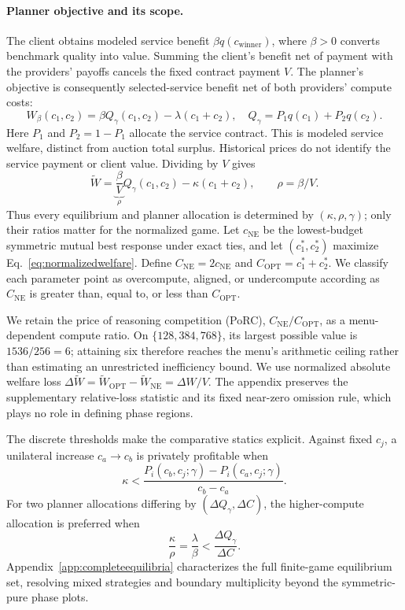 \documentclass{article}
\begin{document}
\paragraph{Planner objective and its scope.}
The client obtains modeled service benefit $\beta q(c_{\mathrm{winner}})$, where $\beta>0$ converts benchmark quality into value. Summing the client's benefit net of payment with the providers' payoffs cancels the fixed contract payment $V$. The planner's objective is consequently selected-service benefit net of both providers' compute costs:
\begin{equation}
 W_{\beta}(c_1,c_2)=\beta Q_\gamma(c_1,c_2)-\lambda(c_1+c_2),
 \quad Q_\gamma=P_1q(c_1)+P_2q(c_2).
\label{eq:welfare}
\end{equation}
Here $P_1$ and $P_2=1-P_1$ allocate the service contract. This is modeled service welfare, distinct from auction total surplus. Historical prices do not identify the service payment or client value. Dividing by $V$ gives
\begin{equation}
 \widetilde W=\underbrace{\frac{\beta}{V}}_{\rho}Q_\gamma(c_1,c_2)
 -\kappa(c_1+c_2),\qquad \boxed{\rho=\beta/V}.
 \label{eq:normalizedwelfare}
\end{equation}
Thus every equilibrium and planner allocation is determined by $(\kappa,\rho,\gamma)$; only their ratios matter for the normalized game. Let $c_{\mathrm{NE}}$ be the lowest-budget symmetric mutual best response under exact ties, and let $(c_1^*,c_2^*)$ maximize Eq.~\eqref{eq:normalizedwelfare}. Define $C_{\mathrm{NE}}=2c_{\mathrm{NE}}$ and $C_{\mathrm{OPT}}=c_1^*+c_2^*$. We classify each parameter point as overcompute, aligned, or undercompute according as $C_{\mathrm{NE}}$ is greater than, equal to, or less than $C_{\mathrm{OPT}}$.

We retain the price of reasoning competition (PoRC), $C_{\mathrm{NE}}/C_{\mathrm{OPT}}$, as a menu-dependent compute ratio. On $\{128,384,768\}$, its largest possible value is $1536/256=6$; attaining six therefore reaches the menu's arithmetic ceiling rather than estimating an unrestricted inefficiency bound. We use normalized absolute welfare loss $\Delta\widetilde W=\widetilde W_{\mathrm{OPT}}-\widetilde W_{\mathrm{NE}}=\Delta W/V$. The appendix preserves the supplementary relative-loss statistic and its fixed near-zero omission rule, which plays no role in defining phase regions.

The discrete thresholds make the comparative statics explicit. Against fixed $c_j$, a unilateral increase $c_a\to c_b$ is privately profitable when
\begin{equation}
 \kappa<\frac{P_i(c_b,c_j;\gamma)-P_i(c_a,c_j;\gamma)}{c_b-c_a}.
 \label{eq:privatethreshold}
\end{equation}
For two planner allocations differing by $(\Delta Q_\gamma,\Delta C)$, the higher-compute allocation is preferred when
\begin{equation}
 \frac{\kappa}{\rho}=\frac{\lambda}{\beta}<\frac{\Delta Q_\gamma}{\Delta C}.
 \label{eq:plannerthreshold}
\end{equation}
Appendix~\ref{app:completeequilibria} characterizes the full finite-game equilibrium set, resolving mixed strategies and boundary multiplicity beyond the symmetric-pure phase plots.
\end{document}
